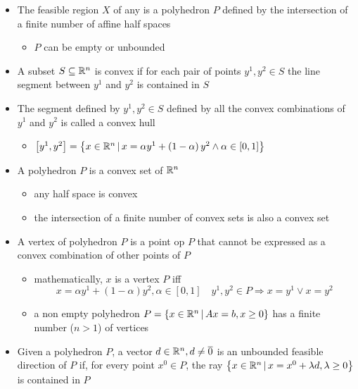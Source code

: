 \documentclass[english]{article}
\begin{document}
\begin{itemize}
  \item The feasible region \(X\) of any \LP is a polyhedron \(P\) defined by the intersection of a finite number of affine half spaces
        \begin{itemize}[label=\(\rightarrow\)]
          \item \(P\) can be empty or unbounded
        \end{itemize}
  \item A subset \(S \subseteq \mathbb{R}^n\) is convex if for each pair of points \(y^1, y^2 \in S\) the line segment between \(y^1\) and \(y^2\) is contained in \(S\)
  \item The segment defined by \(y^1, y^2 \in S\) defined by all the convex combinations of \(y^1\) and \(y^2\) is called a convex hull
        \begin{itemize}[label=\(\rightarrow\)]
          \item \(\left[ y^1, y^2 \right] = \left\{ x \in \mathbb{R}^n \, | \, x = \alpha y^1 + \left( 1-\alpha \right) y^2 \land \alpha \in \left[ 0, 1 \right] \right\}\)
        \end{itemize}
  \item A polyhedron \(P\) is a convex set of \(\mathbb{R}^n\)
        \begin{itemize}
          \item any half space is convex
          \item the intersection of a finite number of convex sets is also a convex set
        \end{itemize}
  \item A vertex of polyhedron \(P\) is a point op \(P\) that cannot be expressed as a convex combination of other points of \(P\)
        \begin{itemize}
          \item mathematically, \(x\) is a vertex \(P\) iff
                \[ x = \alpha y^1 + (1 - \alpha) y^2, \alpha \in \left[ 0, 1 \right] \quad y^1, y^2 \in P \Rightarrow x = y^1 \lor x = y^2 \]
          \item a non empty polyhedron \(P = \left\{ x \in \mathbb{R}^n \, | \,Ax = b, x \geq 0 \right\}\) has a finite number (\(n >1\)) of vertices
        \end{itemize}
  \item Given a polyhedron \(P\), a vector \(d \in \mathbb{R}^n, d \neq \overline{0}\) is an unbounded feasible direction of \(P\) if, for every point \(x^0 \in P\), the ray \(\left\{ x \in \mathbb{R}^n \, | \, x = x^0 + \lambda d, \lambda \geq 0 \right\}\) is contained in \(P\)
\end{itemize}
\end{document}
